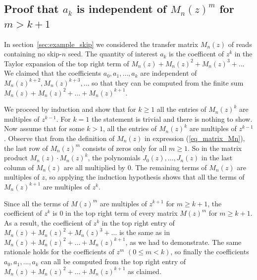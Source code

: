 \documentclass{article}
\begin{document}
\subsection{Proof that $a_k$ is independent of $M_n(z)^m$ for $m > k+1$}
\label{app_skip}

In section~\ref{sec:example_skip} we considered the transfer matrix
$M_n(z)$ of reads containing no skip-$n$ seed. The quantity of interest
$a_k$ is the coefficent of $z^k$ in the Taylor expansion of the top right
term of $M_n(z) + M_n(z)^2 + M_n(z)^3 + \ldots$ We claimed that the
coefficients $a_0, a_1, \ldots, a_k$ are independent of $M_n(z)^{k+2},
M_n(z)^{k+3}, \ldots$ so that they can be computed from the finite sum
$M_n(z) + M_n(z)^2 + \ldots + M_n(z)^{k+1}$.

We proceed by induction and show that for $k \geq 1$ all the entries of
$M_n(z)^k$ are multiples of $z^{k-1}$. For $k = 1$ the statement is
trivial and there is nothing to show. Now assume that for some $k > 1$,
all the entries of $M_n(z)^k$ are multiples of $z^{k-1}$. Observe that
from the definition of $M_n(z)$ in expression (\ref{eq_matrix_Mn}), the
last row of $M_n(z)^m$ consists of zeros only for all $m \geq 1$. So in
the matrix product $M_n(z) \cdot M_n(z)^k$, the polynomials $J_0(z),
\ldots, J_n(z)$ in the last column of $M_n(z)$ are all multiplied by 0.
The remaining terms of $M_n(z)$ are multiples of $z$, so applying the
induction hypothesis shows that all the terms of $M_n(z)^{k+1}$ are
multiples of $z^k$.

Since all the terms of $M(z)^m$ are multiples of $z^{k+1}$ for $m \geq
k+1$, the coefficient of $z^k$ is 0 in the top right term of every matrix
$M(z)^m$ for $m \geq k+1$. As a result, the coefficient of $z^k$ in the
top right entry of $M_n(z) + M_n(z)^2 + M_n(z)^3 + \ldots$ is the same as
in $M_n(z) + M_n(z)^2 + \ldots + M_n(z)^{k+1}$, as we had to demonstrate.
The same rationale holds for the coefficients of $z^m$ $(0 \leq m < k)$,
so finally the coefficients $a_0, a_1, \ldots, a_k$ can all be computed
from the top right entry of $M_n(z) + M_n(z)^2 + \ldots + M_n(z)^{k+1}$ as
claimed.
\end{document}
